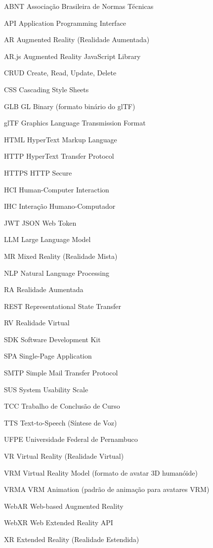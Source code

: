 \documentclass[
  12pt,
  openright,
  twoside,
  a4paper,
  english,
  brazil
]{abntex2}
\begin{document}
\listoffigures*
\cleardoublepage

\listoftables*
\cleardoublepage

\begin{siglas}
  \item[ABNT]  Associação Brasileira de Normas Técnicas
  \item[API]   Application Programming Interface
  \item[AR]    Augmented Reality (Realidade Aumentada)
  \item[AR.js] Augmented Reality JavaScript Library
  \item[CRUD]  Create, Read, Update, Delete
  \item[CSS]   Cascading Style Sheets
  \item[GLB]   GL Binary (formato binário do glTF)
  \item[glTF]  Graphics Language Transmission Format
  \item[HTML]  HyperText Markup Language
  \item[HTTP]  HyperText Transfer Protocol
  \item[HTTPS] HTTP Secure
  \item[HCI]   Human-Computer Interaction
  \item[IHC]   Interação Humano-Computador
  \item[JWT]   JSON Web Token
  \item[LLM]   Large Language Model
  \item[MR]    Mixed Reality (Realidade Mista)
  \item[NLP]   Natural Language Processing
  \item[RA]    Realidade Aumentada
  \item[REST]  Representational State Transfer
  \item[RV]    Realidade Virtual
  \item[SDK]   Software Development Kit
  \item[SPA]   Single-Page Application
  \item[SMTP]  Simple Mail Transfer Protocol
  \item[SUS]   System Usability Scale
  \item[TCC]   Trabalho de Conclusão de Curso
  \item[TTS]   Text-to-Speech (Síntese de Voz)
  \item[UFPE]  Universidade Federal de Pernambuco
  \item[VR]    Virtual Reality (Realidade Virtual)
  \item[VRM]   Virtual Reality Model (formato de avatar 3D humanóide)
  \item[VRMA]  VRM Animation (padrão de animação para avatares VRM)
  \item[WebAR] Web-based Augmented Reality
  \item[WebXR] Web Extended Reality API
  \item[XR]    Extended Reality (Realidade Estendida)
\end{siglas}
\end{document}
